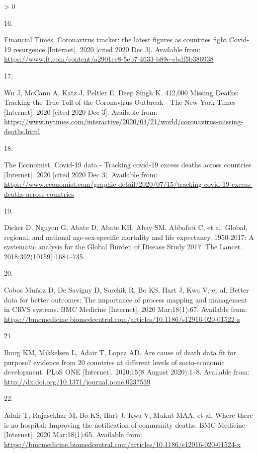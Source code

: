 \documentclass[
]{article}
\newlength{\cslhangindent}
\newlength{\csllabelwidth}
\newenvironment{CSLReferences}[2] %
 {%
  \setlength{\parindent}{0pt}
  \ifodd #1 \everypar{\setlength{\hangindent}{\cslhangindent}}\ignorespaces\fi
  \ifnum #2 > 0
  \setlength{\parskip}{#2\baselineskip}
  \fi
 }%
 {}
\newcommand{\CSLLeftMargin}[1]{\parbox[t]{\csllabelwidth}{#1}}
\newcommand{\CSLRightInline}[1]{\parbox[t]{\linewidth - \csllabelwidth}{#1}\break}
\begin{document}
\begin{CSLReferences}{0}{0}
\leavevmode\hypertarget{ref-FT2020}{}%
\CSLLeftMargin{16. }
\CSLRightInline{Financial Times. {Coronavirus tracker: the latest figures as countries fight Covid-19 resurgence} {[}Internet{]}. 2020 {[}cited 2020 Dec 3{]}. Available from: \url{https://www.ft.com/content/a2901ce8-5eb7-4633-b89c-cbdf5b386938}}

\leavevmode\hypertarget{ref-NYTIMES2020}{}%
\CSLLeftMargin{17. }
\CSLRightInline{Wu J, McCann A, Katz J, Peltier E, Deep Singh K. {412,000 Missing Deaths: Tracking the True Toll of the Coronavirus Outbreak - The New York Times} {[}Internet{]}. 2020 {[}cited 2020 Dec 3{]}. Available from: \url{https://www.nytimes.com/interactive/2020/04/21/world/coronavirus-missing-deaths.html}}

\leavevmode\hypertarget{ref-Economist2020}{}%
\CSLLeftMargin{18. }
\CSLRightInline{The Economist. {Covid-19 data - Tracking covid-19 excess deaths across countries} {[}Internet{]}. 2020 {[}cited 2020 Dec 3{]}. Available from: \url{https://www.economist.com/graphic-detail/2020/07/15/tracking-covid-19-excess-deaths-across-countries}}

\leavevmode\hypertarget{ref-Dicker2018}{}%
\CSLLeftMargin{19. }
\CSLRightInline{Dicker D, Nguyen G, Abate D, Abate KH, Abay SM, Abbafati C, et al. {Global, regional, and national age-sex-specific mortality and life expectancy, 1950-2017: A systematic analysis for the Global Burden of Disease Study 2017}. The Lancet. 2018;392(10159):1684--735. }

\leavevmode\hypertarget{ref-Cobos2020}{}%
\CSLLeftMargin{20. }
\CSLRightInline{Cobos Muñoz D, De Savigny D, Sorchik R, Bo KS, Hart J, Kwa V, et al. {Better data for better outcomes: The importance of process mapping and management in CRVS systems}. BMC Medicine {[}Internet{]}. 2020 Mar;18(1):67. Available from: \url{https://bmcmedicine.biomedcentral.com/articles/10.1186/s12916-020-01522-z}}

\leavevmode\hypertarget{ref-Iburg2020}{}%
\CSLLeftMargin{21. }
\CSLRightInline{Iburg KM, Mikkelsen L, Adair T, Lopez AD. {Are cause of death data fit for purpose? evidence from 20 countries at different levels of socio-economic development}. PLoS ONE {[}Internet{]}. 2020;15(8 August 2020):1--8. Available from: \url{http://dx.doi.org/10.1371/journal.pone.0237539}}

\leavevmode\hypertarget{ref-Adair2020}{}%
\CSLLeftMargin{22. }
\CSLRightInline{Adair T, Rajasekhar M, Bo KS, Hart J, Kwa V, Mukut MAA, et al. {Where there is no hospital: Improving the notification of community deaths}. BMC Medicine {[}Internet{]}. 2020 Mar;18(1):65. Available from: \url{https://bmcmedicine.biomedcentral.com/articles/10.1186/s12916-020-01524-x}}


\end{CSLReferences}
\end{document}
